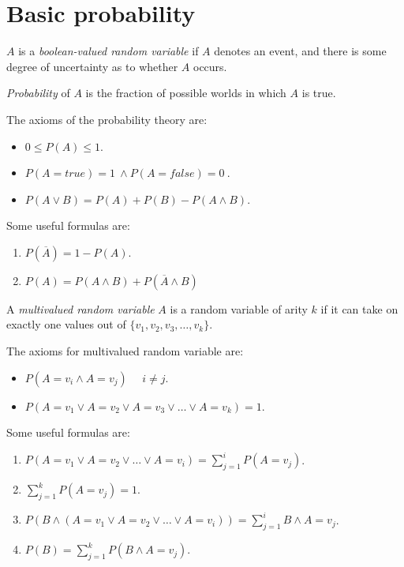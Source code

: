 \documentclass[12pt, a4paper]{report}
\begin{document}
    \section{Basic probability}
    \begin{definition}
        $A$ is a \emph{boolean-valued random variable} if $A$ denotes an event, and there is some degree of uncertainty as to whether $A$ occurs.

        \emph{Probability} of $A$ is the fraction of possible worlds in which $A$ is true. 
    \end{definition}
    \begin{theorem}
        The axioms of the probability theory are: 
        \begin{itemize}
            \item $0 \leq P(A) \leq 1$. 
            \item $P(A=true) = 1 \: \land P(A=false) = 0\: $. 
            \item $P(A \lor B)=P(A)+P(B)-P(A \land B)$.
        \end{itemize}
    \end{theorem}
    Some useful formulas are: 
    \begin{enumerate}
        \item $P(\overline{A})=1-P(A)$.
        \item $P(A)=P(A \land B)+P(\overline{A} \land B)$
    \end{enumerate}
    \begin{definition}
        A \emph{multivalued random variable} $A$ is a random variable of arity $k$ if it can take on exactly one values out of $\{v_1,v_2,v_3,\dots,v_k\}$.
    \end{definition}
    \begin{theorem}
        The axioms for multivalued random variable are: 
        \begin{itemize}
            \item $P(A=v_i \land A=v_j) \:\:\:\:\:\: i \neq j$. 
            \item $P(A=v_1 \lor A=v_2 \lor A=v_3 \lor \dots \lor A=v_k)=1$. 
        \end{itemize}
    \end{theorem}
    Some useful formulas are: 
    \begin{enumerate}
        \item $P(A=v_1 \lor A=v_2 \lor \dots \lor A=v_i)=\sum_{j=1}^{i}{P(A=v_j)}$.
        \item $\sum_{j=1}^{k}{P(A=v_j)}=1$. 
        \item $P(B \land (A=v_1 \lor A=v_2 \lor \dots \lor A=v_i))=\sum_{j=1}^{i}{B \land A=v_j}$. 
        \item $P(B)=\sum_{j=1}^{k}{P(B \land A=v_j)}$.
    \end{enumerate}
\end{document}
